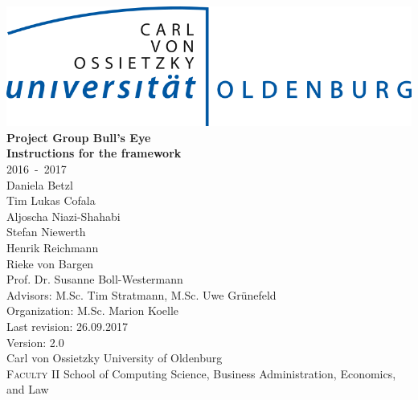 \documentclass[12pt,a4paper,twoside,openright]{scrreprt}
\begin{document}
	
	\pagestyle{plain}
	
	\begin{titlepage}
		
		\begin{center}
			\includegraphics[scale=0.3]{LogoUniOL.png}\\[2.2cm]
			\Huge{\textbf{Project Group Bull's Eye}}\\[0.4cm]
			\huge{\textbf{Instructions for the framework}}\\[0.5cm]
			\Large{2016~-~2017}\\[3ex]
			\large{
				Daniela Betzl\\
				Tim Lukas Cofala\\
				Aljoscha Niazi-Shahabi\\
				Stefan Niewerth\\
				Henrik Reichmann\\
				Rieke von Bargen\\
			}
			\vspace{1.5cm}
			\large{
				Prof. Dr. Susanne Boll-Westermann\\
				Advisors: M.Sc. Tim Stratmann, M.Sc. Uwe Gr\"unefeld\\
				Organization: M.Sc. Marion Koelle \\
				Last revision: 26.09.2017\\
				Version: 2.0\\
				Carl von Ossietzky University of Oldenburg\\
				\textsc{Faculty II } School of Computing Science, Business Administration, Economics, and Law 
			}
		\end{center}
	\end{titlepage}
	
	
\end{document}
